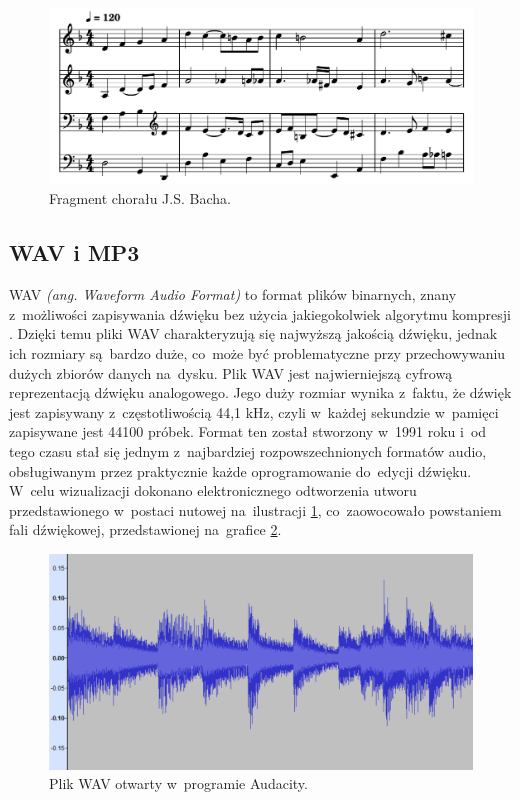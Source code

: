 \documentclass[data-science]{agh-wi} %
\begin{document}
\begin{figure}
    \begin{center}
        \includegraphics[width=0.9\linewidth]{./img/jsb_7_sheet.pdf}
    \end{center}
    \caption{Fragment chorału J.S. Bacha.}\label{fig:jsb_sheet}
\end{figure}
\subsection{WAV i MP3}
WAV \textit{(ang. Waveform Audio Format)} to format plików binarnych, znany z~możliwości zapisywania dźwięku bez użycia jakiegokolwiek algorytmu kompresji \cite{wav_specification}. Dzięki temu pliki WAV charakteryzują się najwyższą jakością dźwięku, jednak ich rozmiary są~bardzo duże, co~może być problematyczne przy przechowywaniu dużych zbiorów danych na~dysku. Plik WAV jest najwierniejszą cyfrową reprezentacją dźwięku analogowego. Jego duży rozmiar wynika z~faktu, że dźwięk jest zapisywany z~częstotliwością 44,1 kHz, czyli w~każdej sekundzie w~pamięci zapisywane jest 44100 próbek. Format ten został stworzony w~1991 roku i~od tego czasu stał się jednym z~najbardziej rozpowszechnionych formatów audio, obsługiwanym przez praktycznie każde oprogramowanie do~edycji dźwięku. W~celu wizualizacji dokonano elektronicznego odtworzenia utworu przedstawionego w~postaci nutowej na~ilustracji \ref*{fig:jsb_sheet}, co~zaowocowało powstaniem fali dźwiękowej, przedstawionej na~grafice \ref*{fig:jsb_wav}.

\begin{figure}
    \begin{center}
        \includegraphics[width=\linewidth]{./img/jsb_wav.png}
    \end{center}
    \caption{Plik WAV otwarty w~programie Audacity.}\label{fig:jsb_wav}
\end{figure}
\end{document}

